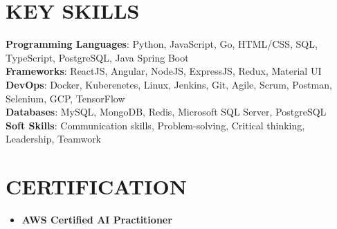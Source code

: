 \documentclass[letterpaper,11pt]{article}
\newcommand{\resumeItem}[1]{
  \item\small{
    {#1 \vspace{-2pt}}
  }
}
\newcommand{\resumeItemListStart}{\begin{itemize}}
\newcommand{\resumeItemListEnd}{\end{itemize}}
\begin{document}
\section{KEY SKILLS}
 \begin{itemize}[leftmargin=0.05in, label={}]
    \small{\item{
     \textbf{Programming Languages}{: Python, JavaScript, Go, HTML/CSS, SQL, TypeScript, PostgreSQL, Java Spring Boot} \\
     \textbf{Frameworks}{: ReactJS, Angular, NodeJS, ExpressJS, Redux, Material UI } \\
     \textbf{DevOps}{: Docker, Kuberenetes, Linux, Jenkins, Git, Agile, Scrum, Postman, Selenium, GCP, TensorFlow} \\
     \textbf{Databases}{: MySQL, MongoDB, Redis, Microsoft SQL Server, PostgreSQL} \\
     \textbf{Soft Skills}{: Communication skills, Problem-solving, Critical thinking, Leadership, Teamwork} \\
    }}
 \end{itemize}
 \vspace{-16pt}


\vspace{3pt}
\section{CERTIFICATION}
\resumeItemListStart
    \resumeItem{\textbf{AWS Certified AI Practitioner} \href{https://www.credly.com/badges/97a62e7f-d930-41de-a7eb-c7d644104deb/public_url}{\faLink}}
\resumeItemListEnd

          
\end{document}

